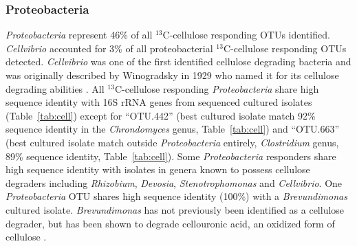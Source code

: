 \documentclass{article}
\begin{document}
\subsubsection{Proteobacteria}\label{cell:proteo}
\textit{Proteobacteria} represent 46\% of all $^{13}$C-cellulose responding
OTUs identified. \textit{Cellvibrio} accounted for 3\% of all proteobacterial
$^{13}$C-cellulose responding OTUs detected. \textit{Cellvibrio} was one of the
first identified cellulose degrading bacteria and was originally described by
Winogradsky in 1929 who named it for its cellulose degrading abilities
\citep{boone2001bergeys}. All $^{13}$C-cellulose responding
\textit{Proteobacteria} share high sequence identity with 16S rRNA genes from
sequenced cultured isolates (Table~\ref{tab:cell}) except for ``OTU.442'' (best
cultured isolate match 92\% sequence identity in the \textit{Chrondomyces}
genus, Table~\ref{tab:cell}) and ``OTU.663'' (best cultured isolate match
outside \textit{Proteobacteria} entirely, \textit{Clostridium} genus, 89\%
sequence identity, Table~\ref{tab:cell}). Some \textit{Proteobacteria}
responders share high sequence identity with isolates in genera known to
possess cellulose degraders including \textit{Rhizobium}, \textit{Devosia},
\textit{Stenotrophomonas} and \textit{Cellvibrio}. One \textit{Proteobacteria}
OTU shares high sequence identity (100\%) with a \textit{Brevundimonas} cultured
isolate.  \textit{Brevundimonas} has not previously been identified as a
cellulose degrader, but has been shown to degrade cellouronic acid, an oxidized
form of cellulose \citep{Tavernier_2008}.
\end{document}
